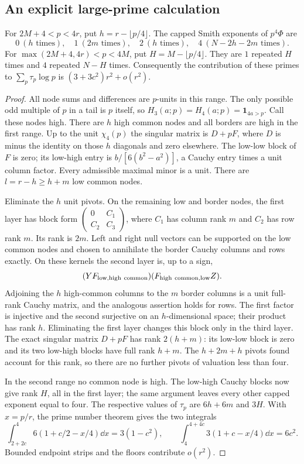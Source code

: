 \subsection{An explicit large-prime calculation}
\begin{proposition}\label{prop:frame-layers}
For $2M+4<p<4r$, put $h=r-\lfloor p/4\rfloor$. The capped Smith
exponents of $p^4\Phi$ are
\[
 0\ (h\text{ times}),\quad1\ (2m\text{ times}),\quad
 2\ (h\text{ times}),\quad4\ (N-2h-2m\text{ times}).
\]
For $\max(2M+4,4r)<p<4M$, put $H=M-\lfloor p/4\rfloor$.
They are $1$ repeated $H$ times and $4$ repeated $N-H$ times.
Consequently the contribution of these primes to $\sum_p\tau_p\log p$
is $(3+3c^2)r^2+o(r^2)$.
\end{proposition}
\begin{proof}
All node sums and differences are $p$-units in this range. The only
possible odd multiple of $p$ in a tail is $p$ itself, so
$H_3(a;p)=H_4(a;p)=\mathbf1_{4a>p}$. Call these nodes high.
There are $h$ high common nodes and all borders are high in the first
range. Up to the unit $\chi_4(p)$ the singular matrix is $D+pF$,
where $D$ is minus the identity on those $h$ diagonals and zero elsewhere.
The low-low block of $F$ is zero; its low-high entry is
$b/[6(b^2-a^2)]$, a Cauchy entry times a unit column factor.
Every admissible maximal minor is a unit. There are
$l=r-h\geq h+m$ low common nodes.

Eliminate the $h$ unit pivots. On the remaining low and border nodes,
the first layer has block form
$\left(\begin{smallmatrix}0&C_1\\C_2&C_3\end{smallmatrix}\right)$,
where $C_1$ has column rank $m$ and $C_2$ has row rank $m$.
Its rank is $2m$. Left and right null vectors can be supported on the
low common nodes and chosen to annihilate the border Cauchy columns
and rows exactly. On these kernels the second layer is, up to a sign,
\[
 (YF_{\rm low,high\ common})(F_{\rm high\ common,low}Z).
\]
Adjoining the $h$ high-common columns to the $m$ border columns is a
unit full-rank Cauchy matrix, and the analogous assertion holds for
rows. The first factor is injective and the second surjective on an
$h$-dimensional space; their product has rank $h$. Eliminating the
first layer changes this block only in the third layer.
The exact singular matrix $D+pF$ has rank $2(h+m)$: its low-low
block is zero and its two low-high blocks have full rank $h+m$.
The $h+2m+h$ pivots found account for this rank, so there are no
further pivots of valuation less than four.

In the second range no common node is high. The low-high Cauchy
blocks now give rank $H$, all in the first layer; the same argument
leaves every other capped exponent equal to four.
The respective values of $\tau_p$ are $6h+6m$ and $3H$.
With $x=p/r$, the prime number theorem gives the two integrals
\[
 \int_{2+2c}^4 6(1+c/2-x/4)\dd x=3(1-c^2),\qquad
 \int_4^{4+4c}3(1+c-x/4)\dd x=6c^2.
\]
Bounded endpoint strips and the floors contribute $o(r^2)$.
\end{proof}

